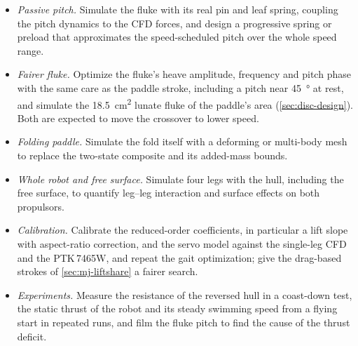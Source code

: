 \begin{itemize}
  \item \emph{Passive pitch.} Simulate the fluke with its real pin and leaf spring, coupling the pitch dynamics to the CFD forces,
        and design a progressive spring or preload that approximates the speed-scheduled pitch over the whole speed range.
  \item \emph{Fairer fluke.} Optimize the fluke's heave amplitude, frequency and pitch phase with the same care as the paddle
        stroke, including a pitch near \SI{45}{\degree} at rest, and simulate the \SI{18.5}{\square\centi\metre} lunate fluke of the
        paddle's area (\cref{sec:disc-design}). Both are expected to move the crossover to lower speed.
  \item \emph{Folding paddle.} Simulate the fold itself with a deforming or multi-body mesh to replace the two-state composite and its
        added-mass bounds.
  \item \emph{Whole robot and free surface.} Simulate four legs with the hull, including the free surface, to quantify leg--leg
        interaction and surface effects on both propulsors.
  \item \emph{Calibration.} Calibrate the reduced-order coefficients, in particular a lift slope with aspect-ratio correction, and the
        servo model against the single-leg CFD and the PTK\,7465W, and repeat the gait optimization; give the drag-based strokes of
        \cref{sec:mj-liftshare} a fairer search.
  \item \emph{Experiments.} Measure the resistance of the reversed hull in a coast-down test, the static thrust of the robot and
        its steady swimming speed from a flying start in repeated runs, and film the fluke pitch to find the cause of the thrust
        deficit.
\end{itemize}
